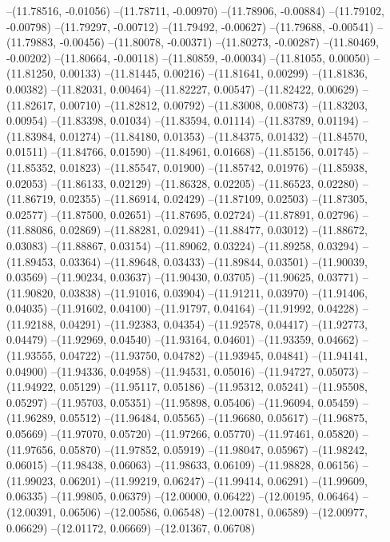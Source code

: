 --(11.78516, -0.01056)
--(11.78711, -0.00970)
--(11.78906, -0.00884)
--(11.79102, -0.00798)
--(11.79297, -0.00712)
--(11.79492, -0.00627)
--(11.79688, -0.00541)
--(11.79883, -0.00456)
--(11.80078, -0.00371)
--(11.80273, -0.00287)
--(11.80469, -0.00202)
--(11.80664, -0.00118)
--(11.80859, -0.00034)
--(11.81055, 0.00050)
--(11.81250, 0.00133)
--(11.81445, 0.00216)
--(11.81641, 0.00299)
--(11.81836, 0.00382)
--(11.82031, 0.00464)
--(11.82227, 0.00547)
--(11.82422, 0.00629)
--(11.82617, 0.00710)
--(11.82812, 0.00792)
--(11.83008, 0.00873)
--(11.83203, 0.00954)
--(11.83398, 0.01034)
--(11.83594, 0.01114)
--(11.83789, 0.01194)
--(11.83984, 0.01274)
--(11.84180, 0.01353)
--(11.84375, 0.01432)
--(11.84570, 0.01511)
--(11.84766, 0.01590)
--(11.84961, 0.01668)
--(11.85156, 0.01745)
--(11.85352, 0.01823)
--(11.85547, 0.01900)
--(11.85742, 0.01976)
--(11.85938, 0.02053)
--(11.86133, 0.02129)
--(11.86328, 0.02205)
--(11.86523, 0.02280)
--(11.86719, 0.02355)
--(11.86914, 0.02429)
--(11.87109, 0.02503)
--(11.87305, 0.02577)
--(11.87500, 0.02651)
--(11.87695, 0.02724)
--(11.87891, 0.02796)
--(11.88086, 0.02869)
--(11.88281, 0.02941)
--(11.88477, 0.03012)
--(11.88672, 0.03083)
--(11.88867, 0.03154)
--(11.89062, 0.03224)
--(11.89258, 0.03294)
--(11.89453, 0.03364)
--(11.89648, 0.03433)
--(11.89844, 0.03501)
--(11.90039, 0.03569)
--(11.90234, 0.03637)
--(11.90430, 0.03705)
--(11.90625, 0.03771)
--(11.90820, 0.03838)
--(11.91016, 0.03904)
--(11.91211, 0.03970)
--(11.91406, 0.04035)
--(11.91602, 0.04100)
--(11.91797, 0.04164)
--(11.91992, 0.04228)
--(11.92188, 0.04291)
--(11.92383, 0.04354)
--(11.92578, 0.04417)
--(11.92773, 0.04479)
--(11.92969, 0.04540)
--(11.93164, 0.04601)
--(11.93359, 0.04662)
--(11.93555, 0.04722)
--(11.93750, 0.04782)
--(11.93945, 0.04841)
--(11.94141, 0.04900)
--(11.94336, 0.04958)
--(11.94531, 0.05016)
--(11.94727, 0.05073)
--(11.94922, 0.05129)
--(11.95117, 0.05186)
--(11.95312, 0.05241)
--(11.95508, 0.05297)
--(11.95703, 0.05351)
--(11.95898, 0.05406)
--(11.96094, 0.05459)
--(11.96289, 0.05512)
--(11.96484, 0.05565)
--(11.96680, 0.05617)
--(11.96875, 0.05669)
--(11.97070, 0.05720)
--(11.97266, 0.05770)
--(11.97461, 0.05820)
--(11.97656, 0.05870)
--(11.97852, 0.05919)
--(11.98047, 0.05967)
--(11.98242, 0.06015)
--(11.98438, 0.06063)
--(11.98633, 0.06109)
--(11.98828, 0.06156)
--(11.99023, 0.06201)
--(11.99219, 0.06247)
--(11.99414, 0.06291)
--(11.99609, 0.06335)
--(11.99805, 0.06379)
--(12.00000, 0.06422)
--(12.00195, 0.06464)
--(12.00391, 0.06506)
--(12.00586, 0.06548)
--(12.00781, 0.06589)
--(12.00977, 0.06629)
--(12.01172, 0.06669)
--(12.01367, 0.06708)
